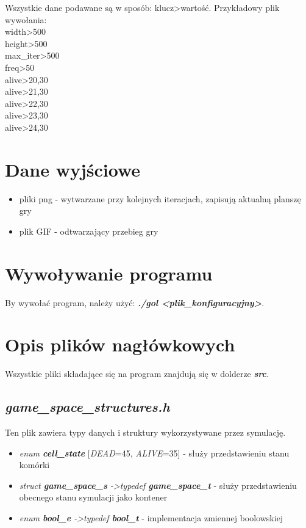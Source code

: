 \documentclass[12pt]{article}
\begin{document}
Wszystkie dane podawane są w sposób: klucz\textgreater{}wartość.
Przykładowy plik wywołania:\\
width\textgreater{}500\\
height\textgreater{}500\\
max\_iter\textgreater{}500\\
freq\textgreater{}50\\
alive\textgreater{}20,30\\
alive\textgreater{}21,30\\
alive\textgreater{}22,30\\
alive\textgreater{}23,30\\
alive\textgreater{}24,30\\

\section{Dane wyjściowe}

\begin{itemize}
	\item pliki png - wytwarzane przy kolejnych iteracjach, zapisują aktualną planszę gry
	\item plik GIF - odtwarzający przebieg gry
\end{itemize}

\section{Wywoływanie programu}

By wywołać program, należy użyć: \textbf{\textit{./gol \textless plik\_konfiguracyjny\textgreater}}.

\section{Opis plików nagłówkowych}
Wszystkie pliki składające się na program znajdują się w dolderze \textbf{\textit{src}}.

    \subsection{\textbf{\textit{game\_space\_structures.h}}}
        Ten plik zawiera typy danych i struktury wykorzystywane przez symulację.

        \begin{itemize}
            \item \textit{enum \textbf{cell\_state}} [\textit{DEAD}=45, \textit{ALIVE}=35] - służy przedstawieniu stanu komórki
            \item \textit{struct \textbf{game\_space\_s} -\textgreater typedef \textbf{game\_space\_t}} - służy przedstawieniu obecnego stanu symulacji jako kontener
            \item \textit{enum \textbf{bool\_e} -\textgreater typedef \textbf{bool\_t}} - implementacja zmiennej boolowskiej
        \end{itemize}
\end{document}
